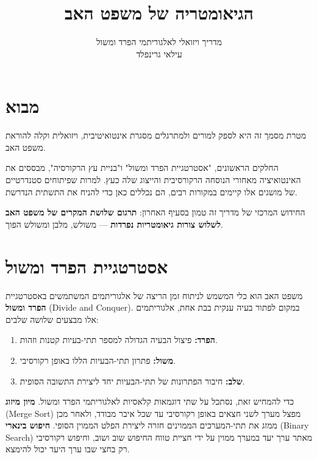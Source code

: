 \documentclass[11pt, a4paper]{article}
\title{\Huge \textbf{הגיאומטריה של משפט האב}}
\author{\Large מדריך ויזואלי לאלגוריתמי הפרד ומשול \\ \vspace{0.2cm} \large עילאי גרינפלד}
\date{}
\begin{document}
\maketitle

\section*{מבוא}

מטרת מסמך זה היא לספק למורים ולמתרגלים מסגרת אינטואיטיבית, ויזואלית וקלה להוראת משפט האב.

החלקים הראשונים, "אסטרטגיית הפרד ומשול" ו"בניית עץ הרקורסיה", מבססים את האינטואיציה מאחורי הנוסחה הרקורסיבית והייצוג שלה כעץ. למרות שפיתוחים סטנדרטיים של מושגים אלו קיימים במקורות רבים, הם נכללים כאן כדי להניח את התשתית הנדרשת.

החידוש המרכזי של מדריך זה טמון בסעיף האחרון: \textbf{תרגום שלושת המקרים של משפט האב לשלוש צורות גיאומטריות נפרדות} — משולש, מלבן ומשולש הפוך.

\newpage
\section*{אסטרטגיית הפרד ומשול}

משפט האב הוא כלי המשמש לניתוח זמן הריצה של אלגוריתמים המשתמשים באסטרטגיית \textbf{הפרד ומשול} (\textenglish{Divide and Conquer}). במקום לפתור בעיה ענקית בבת אחת, אלגוריתמים אלו מבצעים שלושה שלבים:
\begin{enumerate}
    \item \textbf{הפרד:} פיצול הבעיה הגדולה למספר תתי-בעיות קטנות וזהות.
    \item \textbf{משול:} פתרון תתי-הבעיות הללו באופן רקורסיבי.
    \item \textbf{שלב:} חיבור הפתרונות של תתי-הבעיות יחד ליצירת התשובה הסופית.
\end{enumerate}

כדי להמחיש זאת, נסתכל על שתי דוגמאות קלאסיות לאלגוריתמי הפרד ומשול. \textbf{מיון מיזוג} (\textenglish{Merge Sort}) מפצל מערך לשני חצאים באופן רקורסיבי עד שכל איבר מבודד, ולאחר מכן ממזג את תתי-המערכים הממוינים חזרה ליצירת הפלט הממוין הסופי. \textbf{חיפוש בינארי} (\textenglish{Binary Search}) מאתר ערך יעד במערך ממוין על ידי חציית טווח החיפוש שוב ושוב, וחיפוש רקורסיבי רק בחצי שבו ערך היעד יכול להימצא.
\end{document}
